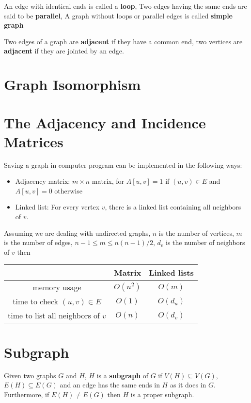 			\begin{definition}
				An edge with identical ends is called a \textbf{loop}, Two edges having the same ends are said to be \textbf{parallel}, A graph without loops or parallel edges is called \textbf{simple graph}
			\end{definition}

			\begin{definition}[Adjacent]
				Two edges of a graph are \textbf{adjacent} if they have a common end, two vertices are \textbf{adjacent} if they are jointed by an edge.
			\end{definition}
		\section{Graph Isomorphism}

		\section{The Adjacency and Incidence Matrices}
			Saving a graph in computer program can be implemented in the following ways:
			\begin{itemize}
				\item Adjacency matrix: $m \times n$ matrix, for $A[u, v] = 1$ if $(u, v) \in E$ and $A[u, v] = 0$ otherwise
				\item Linked list: For every vertex $v$, there is a linked list containing all neighbors of $v$.
			\end{itemize}
			Assuming we are dealing with undirected graphs, $n$ is the number of vertices, $m$ is the number of edges, $n - 1 \le m \le n(n-1)/2$, $d_v$ is the number of neighbors of $v$ then
			\begin{table}[h]
				\centering
				\begin{tabular}{|c|c|c|}
					\hline
					 & Matrix & Linked lists\\
					\hline
					memory usage & $O(n^2)$ & $O(m)$\\
					\hline
					time to check $(u, v) \in E$ & $O(1)$ & $O(d_u)$\\
					\hline
					time to list all neighbors of $v$ & $O(n)$ & $O(d_v)$\\
					\hline
				\end{tabular}
			\end{table}

		\section{Subgraph}
			\begin{definition}[Subgraph]
				Given two graphs $G$ and $H$, $H$ is a \textbf{subgraph} of $G$ if $V(H)\subseteq V(G)$, $E(H)\subseteq E(G)$ and an edge has the same ends in $H$ as it does in $G$. Furthermore, if $E(H)\neq E(G)$ then $H$ is a proper subgraph.
			\end{definition}

